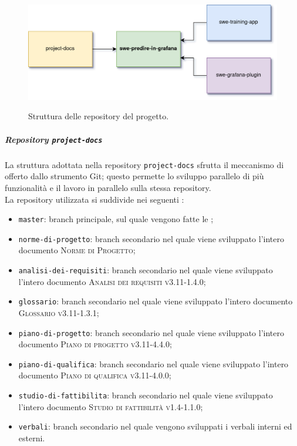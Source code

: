 \documentclass[../norme-di-progetto.tex]{subfiles}
\begin{document}
\begin{figure}[H]
  \centering
  \includegraphics[width=15cm]{img/git-submodules.png}
  \label{fig:errori_pdq}
  \caption{Struttura delle repository del progetto.}
\end{figure}

\subparagraph{Repository \texttt{project-docs}}
La struttura adottata nella repository \texttt{project-docs} sfrutta il meccanismo di  offerto dallo strumento Git; questo permette lo sviluppo parallelo di più funzionalità e il lavoro in parallelo sulla stessa repository. \\
La repository utilizzata si suddivide nei seguenti :
\begin{itemize}
  \item \texttt{master}: branch principale, sul quale vengono fatte le ;
  \item \texttt{norme-di-progetto}: branch secondario nel quale viene sviluppato l'intero documento \textsc{Norme di Progetto};
  \item \texttt{analisi-dei-requisiti}: branch secondario nel quale viene sviluppato l'intero documento \textsc{Analisi dei requisiti v3.11-1.4.0};
  \item \texttt{glossario}: branch secondario nel quale viene sviluppato l'intero documento \textsc{Glossario v3.11-1.3.1};
  \item \texttt{piano-di-progetto}: branch secondario nel quale viene sviluppato l'intero documento \textsc{Piano di progetto v3.11-4.4.0};
  \item \texttt{piano-di-qualifica}: branch secondario nel quale viene sviluppato l'intero documento \textsc{Piano di qualifica v3.11-4.0.0};
  \item \texttt{studio-di-fattibilita}: branch secondario nel quale viene sviluppato l'intero documento \textsc{Studio di fattibilità v1.4-1.1.0};
  \item \texttt{verbali}: branch secondario nel quale vengono sviluppati i verbali interni ed esterni.
\end{itemize}
\end{document}
